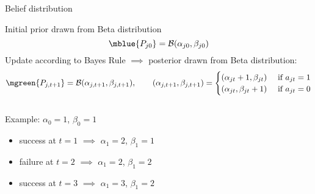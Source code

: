\begin{frame}[t]{Belief distribution}

Initial prior drawn from Beta distribution 
\begin{equation*}
    \mblue{P_{j0}} = \mathcal{B} (\alpha_{j0}, \beta_{j0})
\end{equation*}
Update according to Bayes Rule $\implies$ posterior drawn from Beta distribution:
\begin{equation*}
    \mgreen{P_{j,t+1}} = \mathcal{B} (\alpha_{j,t+1}, \beta_{j,t+1}), \quad \quad 
    (\alpha_{j,t+1}, \beta_{j,t+1}) = 
    \begin{cases} 
        (\alpha_{jt} + 1, \beta_{jt}) &\text{ if } a_{jt} = 1 \\
        (\alpha_{jt}, \beta_{jt} + 1) &\text{ if } a_{jt} = 0
    \end{cases}
\end{equation*}

\vspace{3ex}
\begin{columns}[T] %
\begin{column}{.51\textwidth}

\pause
\vspace{3ex}
Example: $\alpha_0 = 1$, $\beta_0 = 1$
\vspace{1.5ex}
\begin{itemize}
    \item <3-> success at $t=1$ $\implies$ $\alpha_1 = 2$, $\beta_1 = 1$

    \vspace{1.5ex}
    \item <4-> failure at $t=2$ $\implies$ $\alpha_1 = 2$, $\beta_1 = 2$
    
    \vspace{1.5ex}
    \item <5-> success at $t=3$ $\implies$ $\alpha_1 = 3$, $\beta_1 = 2$
\end{itemize}

\end{column}%
\begin{column}{.39\textwidth}
\begin{figure}
\end{figure}
\end{column}%
\end{columns}
\hypertarget<2>{model_beta_11}{
  \hyperlink{simulate}{}
  \hyperlink{sim_default}{}
}
\hypertarget<4>{model_beta_22}{\hyperlink{sim_beliefs}{}}


\end{frame}





